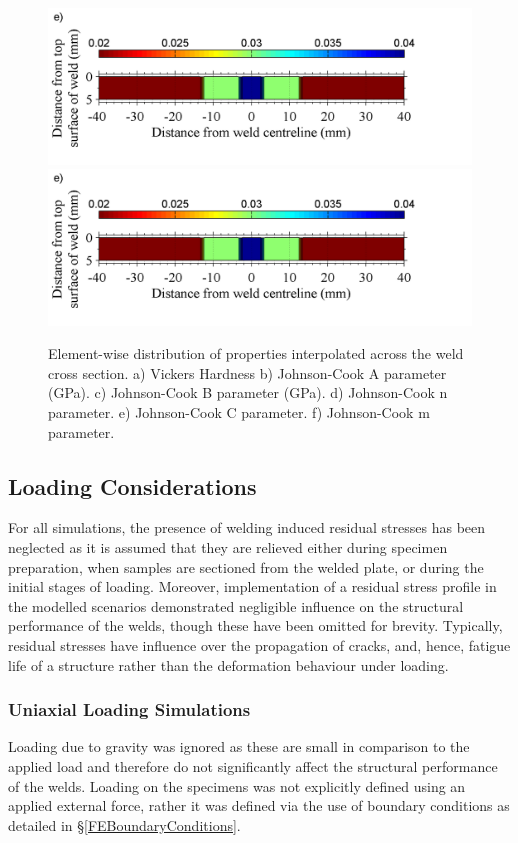 \begin{figure}
	\includegraphics[width=1\linewidth]{JCCaltered}
	\includegraphics[width=1\linewidth]{JCCaltered}
	\caption[Mesh]{Element-wise distribution of properties interpolated across the weld cross section. a) Vickers Hardness b) Johnson-Cook A parameter (GPa). c) Johnson-Cook B parameter (GPa). d) Johnson-Cook n parameter. e) Johnson-Cook C parameter. f) Johnson-Cook m parameter.}
	\label{fig:colormaps}
\end{figure} 

\subsection{Loading Considerations}
\label{FELoadingConsiderations}
For all simulations, the presence of welding induced residual stresses has been neglected as it is assumed that they are relieved either during specimen preparation, when samples are sectioned from the welded plate, or during the initial stages of loading. Moreover, implementation of a residual stress profile in the modelled scenarios demonstrated negligible influence on the structural performance of the welds, though these have been omitted for brevity. Typically, residual stresses have influence over the propagation of cracks, and, hence, fatigue life of a structure rather than the deformation behaviour under loading. 
\subsubsection{Uniaxial Loading Simulations}
\label{FEUniaxialTension}
Loading due to gravity was ignored as these are small in comparison to the applied load and therefore do not significantly affect the structural performance of the welds. Loading on the specimens was not explicitly defined using an applied external force, rather it was defined via the use of boundary conditions as detailed in \S\ref{FEBoundaryConditions}.
